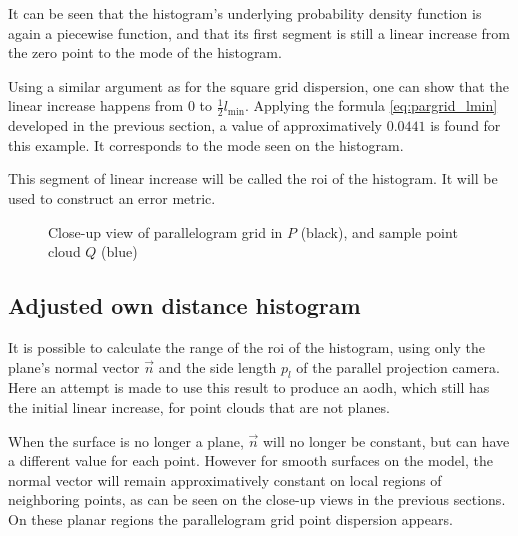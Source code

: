 It can be seen that the histogram's underlying probability density function is again a piecewise function, and that its first segment is still a linear increase from the zero point to the mode of the histogram.

Using a similar argument as for the square grid dispersion, one can show that the linear increase happens from $0$ to $\frac{1}{2} l_\text{min}$. Applying the formula \ref{eq:pargrid_lmin} developed in the previous section, a value of approximatively $0.0441$ is found for this example. It corresponds to the mode seen on the histogram.

This segment of linear increase will be called the \acrfull{roi} of the histogram. It will be used to construct an error metric.

\begin{figure}[p]
\centering
{
	\setlength{\fboxsep}{0pt}%
	\setlength{\fboxrule}{0.5pt}%
}
\caption{Close-up view of parallelogram grid in $P$ (black), and sample point cloud $Q$ (blue)}
\label{fig:par_grid}
\end{figure}



\subsection{Adjusted own distance histogram}
It is possible to calculate the range of the \gls{roi} of the histogram, using only the plane's normal vector $\vec{n}$ and the side length $p_l$ of the parallel projection camera. Here an attempt is made to use this result to produce an \acrfull{aodh}, which still has the initial linear increase, for point clouds that are not planes.

When the surface is no longer a plane, $\vec{n}$ will no longer be constant, but can have a different value for each point. However for smooth surfaces on the model, the normal vector will remain approximatively constant on local regions of neighboring points, as can be seen on the close-up views in the previous sections. On these planar regions the parallelogram grid point dispersion appears.

